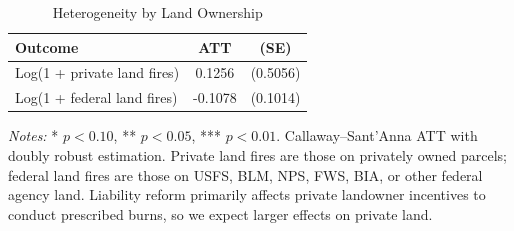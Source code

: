 \begin{table}[H]
\centering
\caption{Heterogeneity by Land Ownership}
\label{tab:heterogeneity}
\begin{threeparttable}
\begin{tabular}{l cc}
\toprule
Outcome & ATT & (SE) \\
\midrule
Log(1 + private land fires) & 0.1256 & (0.5056) \\
Log(1 + federal land fires) & -0.1078 & (0.1014) \\
\bottomrule
\end{tabular}
\begin{tablenotes}[flushleft]
\small
\item \textit{Notes:} * $p<0.10$, ** $p<0.05$, *** $p<0.01$. Callaway--Sant'Anna ATT with doubly robust estimation. Private land fires are those on privately owned parcels; federal land fires are those on USFS, BLM, NPS, FWS, BIA, or other federal agency land. Liability reform primarily affects private landowner incentives to conduct prescribed burns, so we expect larger effects on private land.
\end{tablenotes}
\end{threeparttable}
\end{table}
